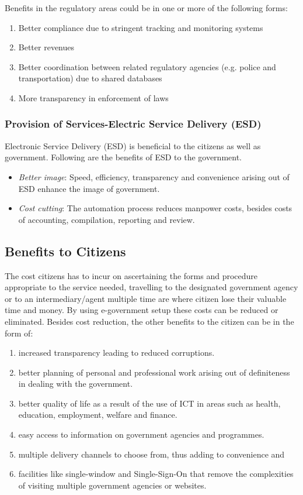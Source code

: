 Benefits in the regulatory areas could be in one or more of the following forms:

\begin{enumerate}
	\item Better compliance due to stringent tracking and monitoring systems
	\item Better revenues
	\item Better coordination between related regulatory agencies (e.g. police and transportation) due to shared databases
	\item More transparency in enforcement of laws
\end{enumerate}

\subsubsection[Electric Service Delivery]{Provision of Services-Electric Service Delivery (ESD)}
Electronic Service Delivery (ESD) is beneficial to the citizens as well as government. Following are the benefits of ESD to the government.

\begin{itemize}
	\item \textit{Better image}: Speed, efficiency, transparency and convenience arising out of ESD enhance the image of government.
	\item \textit{Cost cutting}: The automation process reduces manpower costs, besides costs of accounting, compilation, reporting and review.
\end{itemize}


\subsection{Benefits to Citizens}
The cost citizens has to incur on ascertaining the forms and procedure appropriate to the service needed, travelling to the designated government agency or to an intermediary/agent multiple time are where citizen lose their valuable time and money. By using e-government setup these costs can be reduced or eliminated.
Besides cost reduction, the other benefits to the citizen can be in the form of:

\begin{enumerate}[label=(\alph*)]
	\item increased transparency leading to reduced corruptions.
	\item better planning of personal and professional work arising out of definiteness in dealing with the government.
	\item better quality of life as a result of the use of ICT in areas such as health, education, employment, welfare and finance.
	\item easy access to information on government agencies and programmes.
	\item multiple delivery channels to choose from, thus adding to convenience and
	\item facilities like single-window and Single-Sign-On that remove the complexities of visiting multiple government agencies or websites.
\end{enumerate}


